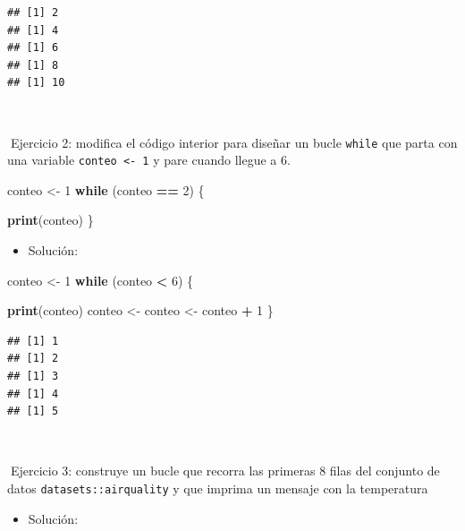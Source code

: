 \documentclass[11pt,]{book}
\newenvironment{Shaded}{\begin{snugshade}}{\end{snugshade}}
\newcommand{\ControlFlowTok}[1]{\textcolor[rgb]{0.27,0.27,0.27}{\textbf{#1}}}
\newcommand{\DecValTok}[1]{\textcolor[rgb]{0.06,0.06,0.06}{#1}}
\newcommand{\KeywordTok}[1]{\textcolor[rgb]{0.27,0.27,0.27}{\textbf{#1}}}
\newcommand{\NormalTok}[1]{#1}
\newcommand{\OperatorTok}[1]{\textcolor[rgb]{0.43,0.43,0.43}{\textbf{#1}}}
\newcommand{\StringTok}[1]{\textcolor[rgb]{0.5,0.5,0.5}{#1}}
\providecommand{\tightlist}{%
  \setlength{\itemsep}{0pt}\setlength{\parskip}{0pt}}
\begin{document}
\begin{verbatim}
## [1] 2
## [1] 4
## [1] 6
## [1] 8
## [1] 10
\end{verbatim}

~

📝Ejercicio 2: modifica el código interior para diseñar un bucle \texttt{while} que parta con una variable \texttt{conteo\ \textless{}-\ 1} y pare cuando llegue a 6.

\begin{Shaded}
\begin{Highlighting}[]
\NormalTok{conteo <-}\StringTok{ }\DecValTok{1}
\ControlFlowTok{while}\NormalTok{ (conteo }\OperatorTok{==}\StringTok{ }\DecValTok{2}\NormalTok{) \{}
  
  \KeywordTok{print}\NormalTok{(conteo)}
\NormalTok{\}}
\end{Highlighting}
\end{Shaded}

\begin{itemize}
\tightlist
\item
  Solución:
\end{itemize}

\begin{Shaded}
\begin{Highlighting}[]
\NormalTok{conteo <-}\StringTok{ }\DecValTok{1}
\ControlFlowTok{while}\NormalTok{ (conteo }\OperatorTok{<}\StringTok{ }\DecValTok{6}\NormalTok{) \{}
  
  \KeywordTok{print}\NormalTok{(conteo)}
\NormalTok{  conteo <-}\StringTok{ }\NormalTok{conteo <-}\StringTok{ }\NormalTok{conteo }\OperatorTok{+}\StringTok{ }\DecValTok{1}
\NormalTok{\}}
\end{Highlighting}
\end{Shaded}

\begin{verbatim}
## [1] 1
## [1] 2
## [1] 3
## [1] 4
## [1] 5
\end{verbatim}

~

📝Ejercicio 3: construye un bucle que recorra las primeras 8 filas del conjunto de datos \texttt{datasets::airquality} y que imprima un mensaje con la temperatura

\begin{itemize}
\tightlist
\item
  Solución:
\end{itemize}

\begin{Shaded}
\end{Shaded}
\end{document}
